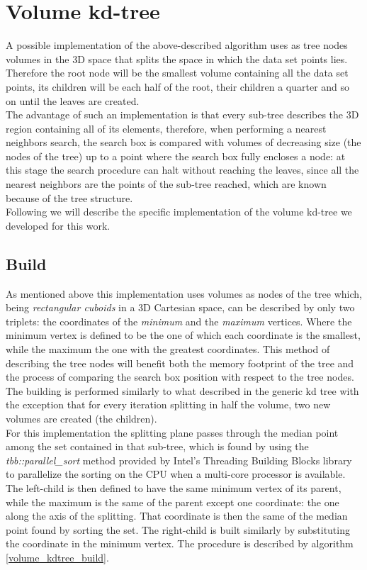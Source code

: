 \section{Volume kd-tree}
A possible implementation of the above-described algorithm uses as tree nodes volumes in the 3D space that splits the space in which the data set points lies. Therefore the root node will be the smallest volume containing all the data set points, its children will be each half of the root, their children a quarter and so on until the leaves are created.\\
The advantage of such an implementation is that every sub-tree describes the 3D region containing all of its elements, therefore, when performing a nearest neighbors search, the search box is compared with volumes of decreasing size (the nodes of the tree) up to a point where the search box fully encloses a node: at this stage the search procedure can halt without reaching the leaves, since all the nearest neighbors are the points of the sub-tree reached, which are known because of the tree structure.\\

Following we will describe the specific implementation of the volume kd-tree we developed for this work.
\subsection{Build}
As mentioned above this implementation uses volumes as nodes of the tree which, being \textit{rectangular cuboids} in a 3D Cartesian space, can be described by only two triplets: the coordinates of the \textit{minimum} and the \textit{maximum} vertices. Where the minimum vertex is defined to be the one of which each coordinate is the smallest, while the maximum the one with the greatest coordinates. This method of describing the tree nodes will benefit both the memory footprint of the tree and the process of comparing the search box position with respect to the tree nodes.\\
The building is performed similarly to what described in the generic kd tree with the exception that for every iteration splitting in half the volume, two new volumes are created (the children).\\
For this implementation the splitting plane passes through the median point among the set contained in that sub-tree, which is found by using the \textit{tbb::parallel\_sort} method provided by Intel's Threading Building Blocks library \cite{intel_tbb} to parallelize the sorting on the CPU when a multi-core processor is available.\\
The left-child is then defined to have the same minimum vertex of its parent, while the maximum is the same of the parent except one coordinate: the one along the axis of the splitting. That coordinate is then the same of the median point found by sorting the set. The right-child is built similarly by substituting the coordinate in the minimum vertex. The procedure is described by algorithm \ref{volume_kdtree_build}.\\

